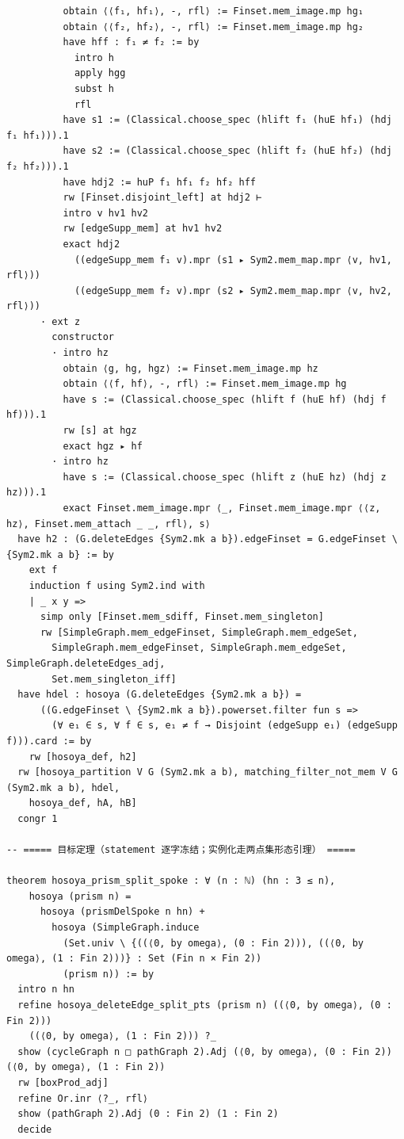 \documentclass[11pt]{article}
\theoremstyle{definition}
\begin{document}
\begin{lstlisting}
          obtain ⟨⟨f₁, hf₁⟩, -, rfl⟩ := Finset.mem_image.mp hg₁
          obtain ⟨⟨f₂, hf₂⟩, -, rfl⟩ := Finset.mem_image.mp hg₂
          have hff : f₁ ≠ f₂ := by
            intro h
            apply hgg
            subst h
            rfl
          have s1 := (Classical.choose_spec (hlift f₁ (huE hf₁) (hdj f₁ hf₁))).1
          have s2 := (Classical.choose_spec (hlift f₂ (huE hf₂) (hdj f₂ hf₂))).1
          have hdj2 := huP f₁ hf₁ f₂ hf₂ hff
          rw [Finset.disjoint_left] at hdj2 ⊢
          intro v hv1 hv2
          rw [edgeSupp_mem] at hv1 hv2
          exact hdj2
            ((edgeSupp_mem f₁ v).mpr (s1 ▸ Sym2.mem_map.mpr ⟨v, hv1, rfl⟩))
            ((edgeSupp_mem f₂ v).mpr (s2 ▸ Sym2.mem_map.mpr ⟨v, hv2, rfl⟩))
      · ext z
        constructor
        · intro hz
          obtain ⟨g, hg, hgz⟩ := Finset.mem_image.mp hz
          obtain ⟨⟨f, hf⟩, -, rfl⟩ := Finset.mem_image.mp hg
          have s := (Classical.choose_spec (hlift f (huE hf) (hdj f hf))).1
          rw [s] at hgz
          exact hgz ▸ hf
        · intro hz
          have s := (Classical.choose_spec (hlift z (huE hz) (hdj z hz))).1
          exact Finset.mem_image.mpr ⟨_, Finset.mem_image.mpr ⟨⟨z, hz⟩, Finset.mem_attach _ _, rfl⟩, s⟩
  have h2 : (G.deleteEdges {Sym2.mk a b}).edgeFinset = G.edgeFinset \ {Sym2.mk a b} := by
    ext f
    induction f using Sym2.ind with
    | _ x y =>
      simp only [Finset.mem_sdiff, Finset.mem_singleton]
      rw [SimpleGraph.mem_edgeFinset, SimpleGraph.mem_edgeSet,
        SimpleGraph.mem_edgeFinset, SimpleGraph.mem_edgeSet, SimpleGraph.deleteEdges_adj,
        Set.mem_singleton_iff]
  have hdel : hosoya (G.deleteEdges {Sym2.mk a b}) =
      ((G.edgeFinset \ {Sym2.mk a b}).powerset.filter fun s =>
        (∀ e₁ ∈ s, ∀ f ∈ s, e₁ ≠ f → Disjoint (edgeSupp e₁) (edgeSupp f))).card := by
    rw [hosoya_def, h2]
  rw [hosoya_partition V G (Sym2.mk a b), matching_filter_not_mem V G (Sym2.mk a b), hdel,
    hosoya_def, hA, hB]
  congr 1

-- ===== 目标定理（statement 逐字冻结；实例化走两点集形态引理） =====

theorem hosoya_prism_split_spoke : ∀ (n : ℕ) (hn : 3 ≤ n),
    hosoya (prism n) =
      hosoya (prismDelSpoke n hn) +
        hosoya (SimpleGraph.induce
          (Set.univ \ {((⟨0, by omega⟩, (0 : Fin 2))), ((⟨0, by omega⟩, (1 : Fin 2)))} : Set (Fin n × Fin 2))
          (prism n)) := by
  intro n hn
  refine hosoya_deleteEdge_split_pts (prism n) ((⟨0, by omega⟩, (0 : Fin 2)))
    ((⟨0, by omega⟩, (1 : Fin 2))) ?_
  show (cycleGraph n □ pathGraph 2).Adj (⟨0, by omega⟩, (0 : Fin 2)) (⟨0, by omega⟩, (1 : Fin 2))
  rw [boxProd_adj]
  refine Or.inr ⟨?_, rfl⟩
  show (pathGraph 2).Adj (0 : Fin 2) (1 : Fin 2)
  decide
\end{lstlisting}
\end{document}
